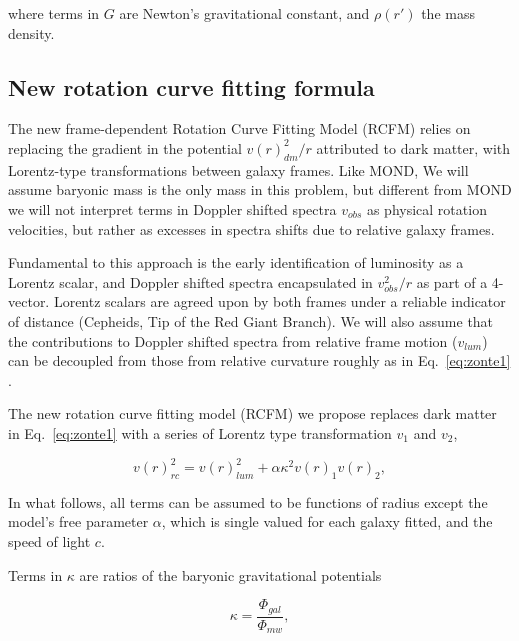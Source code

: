 \documentclass[reprint,%
 amsmath,amssymb,
 aps,
]{revtex4-1}
\begin{document}
 where terms in  $G$  are Newton's   gravitational constant, and 
$\rho(r')$  the mass density. 
  



\subsection{New rotation curve fitting formula}

 The  new 
frame-dependent Rotation Curve Fitting Model (RCFM)   relies on 
replacing the gradient in the potential    $v(r)^2_{dm}/r$  attributed to   dark matter,  with  Lorentz-type transformations between galaxy frames.  Like MOND, We will assume baryonic mass is the only mass in this problem, but different from MOND we will not interpret  terms in Doppler shifted spectra  $v_{obs}$ as physical rotation velocities, but rather as excesses in spectra shifts due to relative galaxy frames. 


Fundamental to this approach is the early identification of  luminosity   as a Lorentz scalar, and Doppler shifted spectra encapsulated in  
  $v^2_{obs}/r$ as part of a 4-vector. Lorentz scalars are agreed upon by both frames under a reliable indicator of  distance (Cepheids, Tip of the Red Giant Branch). 
We  will also assume that the contributions to  Doppler shifted spectra from  relative frame  motion ($v_{lum}$) can be  decoupled from those from relative curvature roughly as in Eq.~\ref{eq:zonte1} \cite{Jack,Cisn}. 



 
 
   
   The new rotation curve fitting model (RCFM) we propose  replaces dark matter in Eq.~\ref{eq:zonte1} with a series of Lorentz type transformation $v_1$ and $v_2$,
   

\begin{equation}
v(r)_{rc}^2 =  v(r)_{lum}^2+\alpha \kappa^2 v(r)_{1} v(r)_{2},  
\label{eq:zonteLCM}
\end{equation}  

  In what follows, all   terms  can be assumed to  be functions of radius except the model's free parameter $\alpha$,  which is single valued for each galaxy fitted, and the speed of light $c$.  
  
  Terms in 
$\kappa$  are   ratios of the baryonic gravitational potentials

 \begin{equation}
\kappa=\frac{\Phi_{gal}}{\Phi_{mw}}, 
\label{eq:kappa2}  
\end{equation}  
\end{document}
